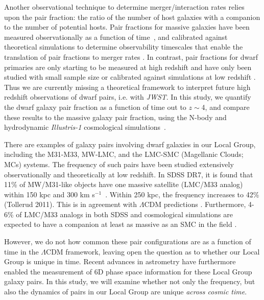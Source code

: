\documentclass[twocolumn]{aastex63}
\begin{document}
Another observational technique to determine merger/interaction rates relies upon the pair fraction: the ratio of the number of host galaxies with a companion to the number of potential hosts. Pair fractions for massive galaxies have been measured observationally as a function of time~\citep[e.g.,][]{lotz08,conselice09}, and calibrated against theoretical simulations to determine observability timescales that enable the translation of pair fractions to merger rates \citep{lotz11,kaviraj15,snyder17,qu17,oleary21b}.
In contrast, pair fractions for dwarf primaries are only starting to be measured at high redshift \citep[e.g.][]{ventou17} and have only been studied with small sample size or calibrated against simulations at low redshift \citep{besla18, casteels14,stierwalt15, pearson18}. Thus we are currently missing a theoretical framework to interpret future high redshift observations of dwarf pairs, i.e. with \textit{JWST}. In this study, we quantify the dwarf galaxy pair fraction as a function of time out to $z\sim$4, and compare these results to the massive galaxy pair fraction, using the N-body and hydrodynamic \textit{Illustris-1} cosmological simulations~\citep{vogelsberger14A,nelson15}.

There are examples of galaxy pairs involving dwarf galaxies in our Local Group, including the M31-M33, MW-LMC, and the LMC-SMC (Magellanic Clouds; MCs) systems. The frequency of such pairs have been studied extensively observationally and theoretically at low redshift.
In SDSS DR7, it is found that 11\% of MW/M31-like objects have one massive satellite (LMC/M33 analog) within 150 kpc and 300 km s$^{-1}$~\citep{liu11}. Within 250 kpc, the frequency increases to 42\% (Tollerud 2011). %
This is in agreement with $\Lambda$CDM predictions \citep{busha11, bk11, patel17a, gonzalez13}. 
Furthermore, 4-6\% of LMC/M33 analogs in both SDSS and cosmological simulations are expected to have a companion at least as massive as an SMC in the field \citep{besla18, sales11}. %

However, we do not how common these pair configurations are as a function of time in the $\Lambda$CDM framework, leaving open the question as to whether our Local Group is unique in time. 
Recent advances in astrometry have furthermore enabled the measurement of 6D phase space information for these Local Group galaxy pairs.  
In this study, we will examine whether not only the frequency, but also the dynamics of pairs in our Local Group are unique \textit{across cosmic time}.
\end{document}
